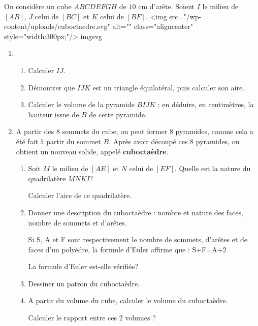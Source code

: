 
%
On considère un cube $ABCDEFGH$ de $10$ cm d'arête. Soient $I$ le milieu de $[AB]$, $J$ celui de $[BC]$ et $K$ celui de $[BF]$.
<img src="/wp-content/uploads/cuboctaedre.svg" alt="" class="aligncenter" style="width:300px;"/>
imgsvg
\begin{enumerate}
     \item
     \begin{enumerate}
          \item
          Calculer $IJ$.
          \item
          Démontrer que $IJK$ est un triangle équilatéral, puis calculer son aire.
          \item
          Calculer le volume de la pyramide $BIJK$ ; en déduire, en centimètres, la hauteur issue de $B$ de cette pyramide.
     \end{enumerate}
     \item
     A partir des 8 sommets du cube, on peut former 8 pyramides, comme cela a été fait à partir du sommet $B$. Après avoir découpé ces 8 pyramides, on obtient un nouveau solide, appelé  \textbf{cuboctaèdre}.
     \begin{enumerate}
          \item
          Soit $M$ le milieu de $[AE]$ et $N$ celui de $[EF]$. Quelle est la nature du quadrilatère $MNKI$?
          \par
          Calculer l'aire de ce quadrilatère.
          \item
          Donner une description du cuboctaèdre : nombre et nature des faces, nombre de sommets et d'arêtes.
          \par
          Si S, A et F sont respectivement le nombre de sommets, d'arêtes et de faces d'un polyèdre, la formule d'Euler affirme que : S+F=A+2
          \par
          La formule d'Euler est-elle vérifiée?
          \item
          Dessiner un patron du cuboctaèdre.
          \item
          A partir du volume du cube, calculer le volume du cuboctaèdre.
          \par
          Calculer le rapport entre ces 2 volumes ?
     \end{enumerate}
\end{enumerate}
